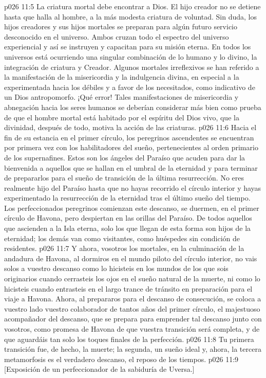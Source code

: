 \vs p026 11:5 \pc La criatura mortal debe encontrar a Dios. El hijo creador no se detiene hasta que halla al hombre, a la más modesta criatura de voluntad. Sin duda, los hijos creadores y sus hijos mortales se preparan para algún futuro servicio desconocido en el universo. Ambos cruzan todo el espectro del universo experiencial y así se instruyen y capacitan para su misión eterna. En todos los universos está ocurriendo una singular combinación de lo humano y lo divino, la integración de criatura y Creador. Algunos mortales irreflexivos se han referido a la manifestación de la misericordia y la indulgencia divina, en especial a la experimentada hacia los débiles y a favor de los necesitados, como indicativo de un Dios antropomorfo. ¡Qué error! Tales manifestaciones de misericordia y abnegación hacia los seres humanos se deberían considerar más bien como prueba de que el hombre mortal está habitado por el espíritu del Dios vivo, que la divinidad, después de todo, motiva la acción de las criaturas.
\vs p026 11:6 \pc Hacia el fin de su estancia en el primer círculo, los peregrinos ascendentes se encuentran por primera vez con los habilitadores del sueño, pertenecientes al orden primario de los supernafines. Estos son los ángeles del Paraíso que acuden para dar la bienvenida a aquellos que se hallan en el umbral de la eternidad y para terminar de prepararlos para el sueño de transición de la última resurrección. No eres realmente hijo del Paraíso hasta que no hayas recorrido el círculo interior y hayas experimentado la resurrección de la eternidad tras el último sueño del tiempo. Los perfeccionados peregrinos comienzan este descanso, se duermen, en el primer círculo de Havona, pero despiertan en las orillas del Paraíso. De todos aquellos que ascienden a la Isla eterna, solo los que llegan de esta forma son hijos de la eternidad; los demás van como visitantes, como huéspedes sin condición de residentes.
\vs p026 11:7 Y ahora, vosotros los mortales, en la culminación de la andadura de Havona, al dormiros en el mundo piloto del círculo interior, no vais solos a vuestro descanso como lo hicisteis en los mundos de los que sois originarios cuando cerrasteis los ojos en el sueño natural de la muerte, ni como lo hicisteis cuando entrasteis en el largo trance de tránsito en preparación para el viaje a Havona. Ahora, al prepararos para el descanso de consecución, se coloca a vuestro lado vuestro colaborador de tantos años del primer círculo, el majestuoso acompañador del descanso, que se prepara para emprender tal descanso junto con vosotros, como promesa de Havona de que vuestra transición será completa, y de que aguardáis tan solo los toques finales de la perfección.
\vs p026 11:8 Tu primera transición fue, de hecho, la muerte; la segunda, un sueño ideal y, ahora, la tercera metamorfosis es el verdadero descanso, el reposo de los tiempos.
\vsetoff
\vs p026 11:9 [Exposición de un perfeccionador de la sabiduría de Uversa.]
